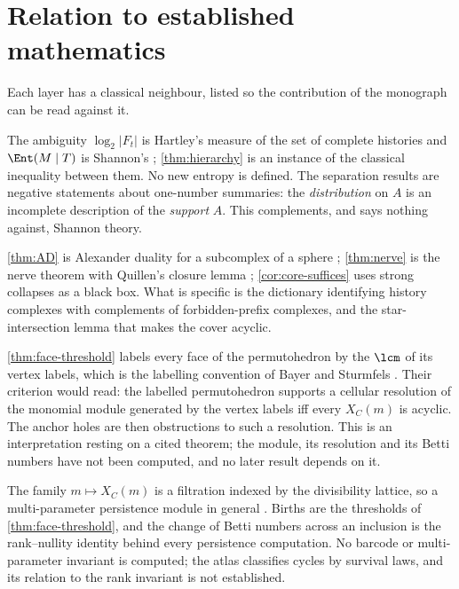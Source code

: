 \section{Relation to established mathematics}\label{sec:relations}
Each layer has a classical neighbour, listed so the contribution of the monograph can be read against it.
\begin{description}[leftmargin=1.4em,nosep]
\item[Shannon and Hartley.] The ambiguity $\log_2|F_t|$ is Hartley's measure of the set of complete histories and $\Ent(M\mid T)$ is Shannon's \cite{Hartley28,Shannon48,CoverThomas}; \cref{thm:hierarchy} is an instance of the classical inequality between them. No new entropy is defined. The separation results are negative statements about one-number summaries: the \emph{distribution} on $A$ is an incomplete description of the \emph{support} $A$. This complements, and says nothing against, Shannon theory.
\item[Alexander duality, nerves, strong homotopy.] \cref{thm:AD} is Alexander duality for a subcomplex of a sphere \cite{Hatcher,Munkres}; \cref{thm:nerve} is the nerve theorem \cite{Borsuk,Bjorner} with Quillen's closure lemma \cite{Quillen}; \cref{cor:core-suffices} uses strong collapses \cite{BarmakMinian} as a black box. What is specific is the dictionary identifying history complexes with complements of forbidden-prefix complexes, and the star-intersection lemma that makes the cover acyclic.
\item[Combinatorial commutative algebra.] \cref{thm:face-threshold} labels every face of the permutohedron by the $\lcm$ of its vertex labels, which is the labelling convention of Bayer and Sturmfels \cite{BayerSturmfels,MillerSturmfels}. Their criterion would read: the labelled permutohedron supports a cellular resolution of the monomial module generated by the vertex labels iff every $X_C(m)$ is acyclic. The anchor holes are then obstructions to such a resolution. This is an interpretation resting on a cited theorem; the module, its resolution and its Betti numbers have not been computed, and no later result depends on it.
\item[Persistent homology.] The family $m\mapsto X_C(m)$ is a filtration indexed by the divisibility lattice, so a multi-parameter persistence module in general \cite{ELZ02,Carlsson09,CarlssonZomorodian}. Births are the thresholds of \cref{thm:face-threshold}, and the change of Betti numbers across an inclusion is the rank--nullity identity behind every persistence computation. No barcode or multi-parameter invariant is computed; the atlas classifies cycles by survival laws, and its relation to the rank invariant is not established.

\end{description}
